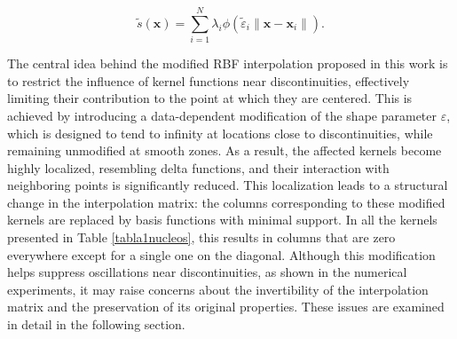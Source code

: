 \documentclass[preprint]{elsarticle}       %
\begin{document}
\begin{equation}\label{int}
\tilde s(\mathbf{x}) = \sum_{i=1}^N \lambda_i \phi(\tilde\varepsilon_i\|\mathbf{x} - \mathbf{x}_i\|).
\end{equation}

The central idea behind the modified RBF interpolation proposed in this work is to restrict the influence of kernel functions near discontinuities, effectively limiting their contribution to the point at which they are centered. This is achieved by introducing a data-dependent modification of the shape parameter $\varepsilon$, which is designed to tend to infinity at locations close to discontinuities, while remaining unmodified at smooth zones. As a result, the affected kernels become highly localized, resembling %
delta functions, and their interaction with neighboring points is significantly reduced. This localization leads to a structural change in the interpolation matrix: the columns corresponding to these modified kernels are replaced by basis functions with minimal support. In all the kernels presented in Table \ref{tabla1nucleos}, this results in columns that are zero everywhere except for a single one on the diagonal. Although this modification helps suppress oscillations near discontinuities, as shown in the numerical experiments, it may raise concerns about the invertibility of the interpolation matrix and the preservation of its original properties. These issues are examined in detail in the following section.
\end{document}
